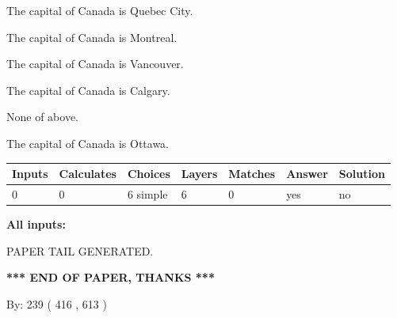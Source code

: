 \documentclass[12pt]{article}
\begin{document}
 
The capital of Canada is Quebec City.
 
 
The capital of Canada is Montreal.
 
 
The capital of Canada is Vancouver.
 
 
The capital of Canada is Calgary.
 
 
 None of above.
 
 
\noindent{}
 
 
The capital of Canada is Ottawa.
 
 
\noindent{}
 
 
   
   
   
   
\noindent\begin{tabular}{|l|l|l|l|l|l|l|}
 \hline
Inputs & Calculates & Choices & Layers & Matches & Answer & Solution \\ \hline
 0  & 
 0  & 
 6
  simple  
  & 
 6  & 
 0  & 
  yes & 
  no 
  \\ \hline
 \end{tabular}
   
   
   
   
\noindent{}
   
   
   
   
\noindent\vspace{0.1in}\hspace{-0.08in} {\textbf{\Large{All inputs: }}}
   
   
   
   
   
   
 \vspace{0.2in}
 
   
   
\vspace{2.0in} PAPER TAIL GENERATED.
   
   
   
   
\vspace{1.0in} 
{\textbf{\large{ *** END OF PAPER, THANKS *** }}} 
   
   
\hspace{1.0in} By: 
 239 ( 416 ,  613 )
   
\end{document}

